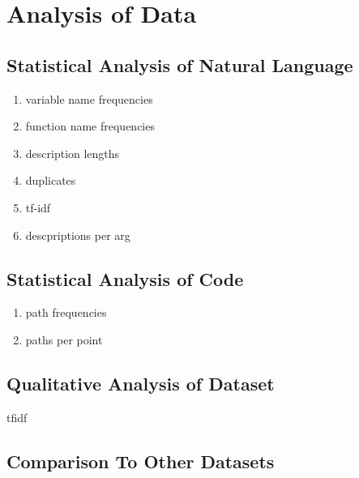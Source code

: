 \section{Analysis of Data} %
\label{sec:analysis_of_data}


\subsection{Statistical Analysis of Natural Language} %
\label{sub:statistical_analysis_of_natural_language}

\begin{enumerate}
    \item variable name frequencies
    \item function name frequencies
    \item description lengths
    \item duplicates 
    \item tf-idf
    \item descpriptions per arg
\end{enumerate}


\subsection{Statistical Analysis of Code} %
\label{sub:statistical_analysis_of_code}

\begin{enumerate}
    \item path frequencies
    \item paths per point
\end{enumerate}


\subsection{Qualitative Analysis of Dataset} %
\label{sub:qualitative_analysis_}

tfidf

\subsection{Comparison To Other Datasets} %
\label{sub:comparison_to_other_datasets}

